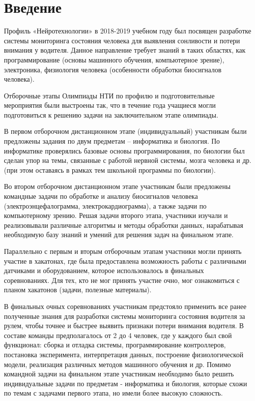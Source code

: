 %
\begingroup
\pagestyle{empty}

\section*{Введение}

Профиль «Нейротехнологии» в 2018-2019 учебном году был посвящен разработке системы мониторинга состояния человека для выявления сонливости и потери внимания у водителя. Данное направление требует знаний в таких областях, как программирование (основы машинного обучения, компьютерное зрение), электроника, физиология человека (особенности обработки биосигналов человека).

Отборочные этапы Олимпиады НТИ по профилю и подготовительные мероприятия были выстроены так, что в течение года учащиеся могли  подготовиться к решению задачи на заключительном этапе олимпиады.

В первом отборочном дистанционном этапе (индивидуальный) участникам были предложены задания по двум предметам – информатика и биология. По информатике проверялись базовые основы программирования, по биологии был сделан упор на темы, связанные с работой нервной системы, мозга человека и др. (при этом оставаясь в рамках тем школьной программы по биологии).

Во втором отборочном дистанционном этапе участникам были предложены командные задачи по обработке и анализу биосигналов человека (электроэнцефалограмма, электрокардиограмма), а также задачи по компьютерному зрению. Решая задачи второго этапа, участники изучали и реализовывали различные алгоритмы и методы обработки данных, нарабатывая необходимую базу знаний и умений для решения задач на финальном этапе.

Параллельно с первым и вторым отборочным этапам участники могли принять участие в хакатонах, где была предоставлена возможность работы с различными датчиками и оборудованием, которое использовалось в финальных соревнованиях. Для тех, кто не мог принять участие очно, мог ознакомиться с планом хакатонов (задачи, полезные материалы).

В финальных очных соревнованиях участникам предстояло применить все ранее полученные знания для разработки системы мониторинга состояния водителя за рулем, чтобы точнее и быстрее выявить признаки потери внимания водителя. В составе команды предполагалось от 2 до 4 человек, где у каждого был свой функционал: сборка и отладка системы, программирование контроллеров, постановка эксперимента, интерпретация данных, построение физиологической модели, реализация различных методов машинного обучения и др.  Помимо командной задачи на финальном этапе участникам необходимо было решить индивидуальные задачи по предметам - информатика и биология, которые схожи по темам с задачами первого этапа, но имели более высокую сложность.

\clearpage
\endgroup